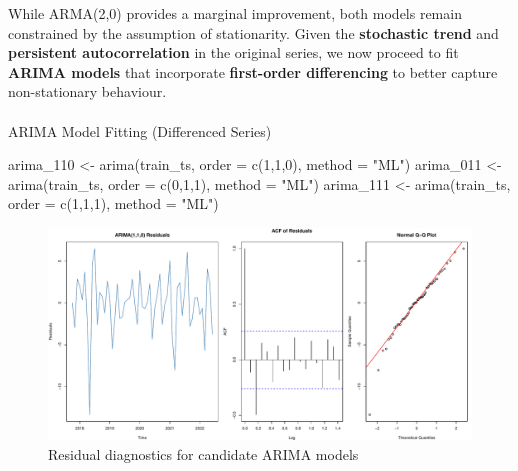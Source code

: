 \documentclass[
  11pt,
]{article}
\makeatletter
\let\oldparagraph\paragraph
\renewcommand{\paragraph}{
    \@ifstar
      \xxxParagraphStar
      \xxxParagraphNoStar
  }
\newcommand{\xxxParagraphStar}[1]{\oldparagraph*{#1}\mbox{}}
\newcommand{\xxxParagraphNoStar}[1]{\oldparagraph{#1}\mbox{}}
\newenvironment{Shaded}{\begin{snugshade}}{\end{snugshade}}
\newcommand{\AttributeTok}[1]{\textcolor[rgb]{0.40,0.45,0.13}{#1}}
\newcommand{\DecValTok}[1]{\textcolor[rgb]{0.68,0.00,0.00}{#1}}
\newcommand{\FunctionTok}[1]{\textcolor[rgb]{0.28,0.35,0.67}{#1}}
\newcommand{\NormalTok}[1]{\textcolor[rgb]{0.00,0.23,0.31}{#1}}
\newcommand{\OtherTok}[1]{\textcolor[rgb]{0.00,0.23,0.31}{#1}}
\newcommand{\StringTok}[1]{\textcolor[rgb]{0.13,0.47,0.30}{#1}}
\makeatother
\begin{document}
While ARMA(2,0) provides a marginal improvement, both models remain
constrained by the assumption of stationarity. Given the
\textbf{stochastic trend} and \textbf{persistent autocorrelation} in the
original series, we now proceed to fit \textbf{ARIMA models} that
incorporate \textbf{first-order differencing} to better capture
non-stationary behaviour.

\paragraph{ARIMA Model Fitting (Differenced
Series)}\label{arima-model-fitting-differenced-series}

\begin{Shaded}
\begin{Highlighting}[]
\NormalTok{arima\_110 }\OtherTok{\textless{}{-}} \FunctionTok{arima}\NormalTok{(train\_ts, }\AttributeTok{order =} \FunctionTok{c}\NormalTok{(}\DecValTok{1}\NormalTok{,}\DecValTok{1}\NormalTok{,}\DecValTok{0}\NormalTok{), }\AttributeTok{method =} \StringTok{"ML"}\NormalTok{)}
\NormalTok{arima\_011 }\OtherTok{\textless{}{-}} \FunctionTok{arima}\NormalTok{(train\_ts, }\AttributeTok{order =} \FunctionTok{c}\NormalTok{(}\DecValTok{0}\NormalTok{,}\DecValTok{1}\NormalTok{,}\DecValTok{1}\NormalTok{), }\AttributeTok{method =} \StringTok{"ML"}\NormalTok{)}
\NormalTok{arima\_111 }\OtherTok{\textless{}{-}} \FunctionTok{arima}\NormalTok{(train\_ts, }\AttributeTok{order =} \FunctionTok{c}\NormalTok{(}\DecValTok{1}\NormalTok{,}\DecValTok{1}\NormalTok{,}\DecValTok{1}\NormalTok{), }\AttributeTok{method =} \StringTok{"ML"}\NormalTok{)}
\end{Highlighting}
\end{Shaded}

\begin{figure}[H]

{\centering \includegraphics{project_files/figure-pdf/fig-arima-diagnostics-1.pdf}

}

\caption{Residual diagnostics for candidate ARIMA models}

\end{figure}%
\end{document}
